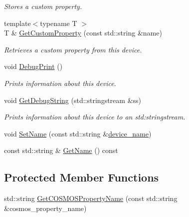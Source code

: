 \begin{DoxyCompactItemize}
\begin{DoxyCompactList}\small\item\em Stores a custom property. \end{DoxyCompactList}\item 
{\footnotesize template$<$typename T $>$ }\\T \& \hyperlink{classcubesat_1_1Device_abdd7840e18fc3fe8127641819817450d}{Get\+Custom\+Property} (const std\+::string \&name)
\begin{DoxyCompactList}\small\item\em Retrieves a custom property from this device. \end{DoxyCompactList}\item 
void \hyperlink{classcubesat_1_1Device_ac93bdbe5c92221c158dfc58b60518956}{Debug\+Print} ()
\begin{DoxyCompactList}\small\item\em Prints information about this device. \end{DoxyCompactList}\item 
void \hyperlink{classcubesat_1_1Device_a2bc1682e91b0e2cce693bd7f2f88f052}{Get\+Debug\+String} (std\+::stringstream \&ss)
\begin{DoxyCompactList}\small\item\em Prints information about this device to an std\+:stringstream. \end{DoxyCompactList}\item 
void \hyperlink{classcubesat_1_1Device_a90374e827bf35d0ec47d5983b55a892b}{Set\+Name} (const std\+::string \&\hyperlink{classcubesat_1_1Device_abb55814f123cad387d84a0802da29bd7}{device\+\_\+name})
\item 
const std\+::string \& \hyperlink{classcubesat_1_1Device_a599328b0664f0ea2099e3ca1de79779f}{Get\+Name} () const
\end{DoxyCompactItemize}
\subsection*{Protected Member Functions}
\begin{DoxyCompactItemize}
\item 
std\+::string \hyperlink{classcubesat_1_1Device_ad658ff2e014f927a65673a15e15ae4ba}{Get\+C\+O\+S\+M\+O\+S\+Property\+Name} (const std\+::string \&cosmos\+\_\+property\+\_\+name)
\end{DoxyCompactItemize}
